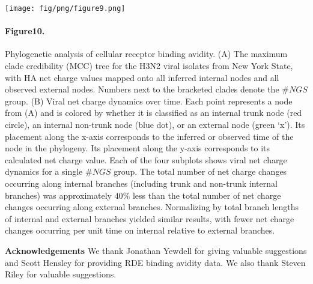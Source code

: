 \documentclass[12pt,a4paper]{article}
\begin{document}
\texttt{[image: fig/png/figure9.png]}
\paragraph*{Figure10.}
\label{Fig10}
Phylogenetic  analysis  of cellular receptor binding avidity. (A) The maximum clade credibility (MCC) tree for the H3N2 viral isolates from New York State, with HA net charge values mapped onto all inferred internal nodes and all observed external nodes. Numbers next to the bracketed clades denote the $\#NGS$ group. (B) Viral net charge dynamics over time. Each point represents a node from (A) and is colored by whether it is classified as an internal trunk node (red circle), an internal non-trunk node (blue dot), or an external node (green ‘x’). Its placement along the x-axis corresponds to the inferred or observed time of the node in the phylogeny. Its placement along the y-axis corresponds to its calculated net charge value. Each of the four subplots shows viral net charge dynamics for a single $\#NGS$ group. The total number of net charge changes occurring along internal branches (including trunk and non-trunk internal branches) was approximately $40\%$ less than the total number of net charge changes occurring along external branches. Normalizing by total branch lengths of internal and external branches yielded similar results, with fewer net charge changes occurring per unit time on internal relative to external branches.
\clearpage

\clearpage

{\bf Acknowledgements}
We thank Jonathan Yewdell for giving valuable suggestions and Scott Hensley for providing RDE binding avidity data. We also thank Steven Riley for valuable suggestions.  \\


%

\clearpage

\end{document}
